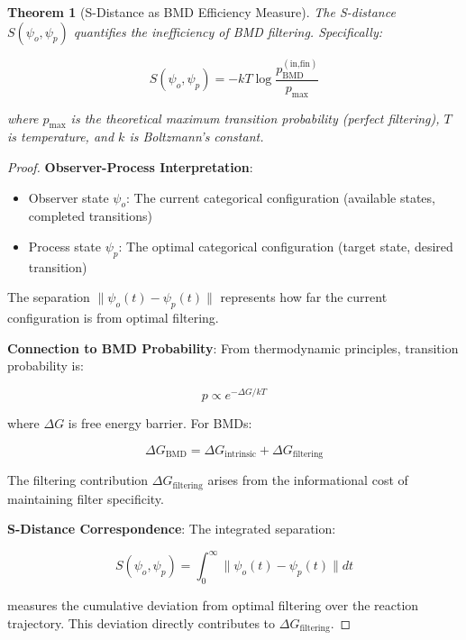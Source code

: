 \documentclass[12pt,a4paper]{article}
\newtheorem{theorem}{Theorem}[section]
\begin{document}
\begin{theorem}[S-Distance as BMD Efficiency Measure]
\label{thm:s_distance_bmd}
The S-distance $S(\psi_o, \psi_p)$ quantifies the inefficiency of BMD filtering. Specifically:

\begin{equation}
S(\psi_o, \psi_p) = -k T \log \frac{p_{\text{BMD}}^{(\text{in,fin})}}{p_{\text{max}}}
\end{equation}

where $p_{\text{max}}$ is the theoretical maximum transition probability (perfect filtering), $T$ is temperature, and $k$ is Boltzmann's constant.
\end{theorem}

\begin{proof}
\textbf{Observer-Process Interpretation}: 
\begin{itemize}
\item Observer state $\psi_o$: The current categorical configuration (available states, completed transitions)
\item Process state $\psi_p$: The optimal categorical configuration (target state, desired transition)
\end{itemize}

The separation $\|\psi_o(t) - \psi_p(t)\|$ represents how far the current configuration is from optimal filtering.

\textbf{Connection to BMD Probability}: From thermodynamic principles, transition probability is:

\begin{equation}
p \propto e^{-\Delta G/kT}
\end{equation}

where $\Delta G$ is free energy barrier. For BMDs:

\begin{equation}
\Delta G_{\text{BMD}} = \Delta G_{\text{intrinsic}} + \Delta G_{\text{filtering}}
\end{equation}

The filtering contribution $\Delta G_{\text{filtering}}$ arises from the informational cost of maintaining filter specificity.

\textbf{S-Distance Correspondence}: The integrated separation:

\begin{equation}
S(\psi_o, \psi_p) = \int_0^{\infty} \|\psi_o(t) - \psi_p(t)\| dt
\end{equation}

measures the cumulative deviation from optimal filtering over the reaction trajectory. This deviation directly contributes to $\Delta G_{\text{filtering}}$.


\end{proof}
\end{document}

